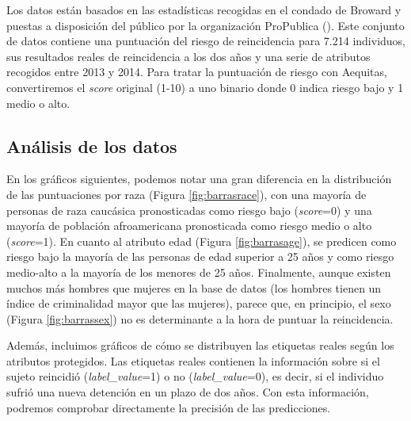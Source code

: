 Los datos están basados en las estadísticas recogidas en el condado de Broward y puestas a disposición del público por la organización ProPublica (\cite{condena2016}). Este conjunto de datos contiene una puntuación del riesgo de reincidencia para 7.214 individuos, sus resultados reales de reincidencia a los dos años y una serie de atributos recogidos entre 2013 y 2014. Para tratar la puntuación de riesgo con Aequitas, convertiremos el \textit{score} original (1-10) a uno binario donde 0 indica riesgo bajo y 1 medio o alto.

\subsection*{Análisis de los datos}

En los gráficos siguientes, podemos notar una gran diferencia en la distribución de las puntuaciones por raza (Figura \ref{fig:barrasrace}), con una mayoría de personas de raza caucásica pronosticadas como riesgo bajo (\textit{score}=0) y una mayoría de población afroamericana pronosticada como riesgo medio o alto (\textit{score}=1). En cuanto al atributo edad (Figura \ref{fig:barrasage}), se predicen como riesgo bajo la mayoría de las personas de edad superior a 25 años y como riesgo medio-alto a la mayoría de los menores de 25 años. Finalmente, aunque existen muchos más hombres que mujeres en la base de datos (los hombres tienen un índice de criminalidad mayor que las mujeres), parece que, en principio, el sexo (Figura \ref{fig:barrassex}) no es determinante a la hora de puntuar la reincidencia.

Además, incluimos gráficos de cómo se distribuyen las etiquetas reales según los atributos protegidos. Las etiquetas reales contienen la información sobre si el sujeto reincidió (\textit{label\_value}=1) o no (\textit{label\_value}=0), es decir, si el individuo sufrió una nueva detención en un plazo de dos años. Con esta información, podremos comprobar directamente la precisión de las predicciones.\\

